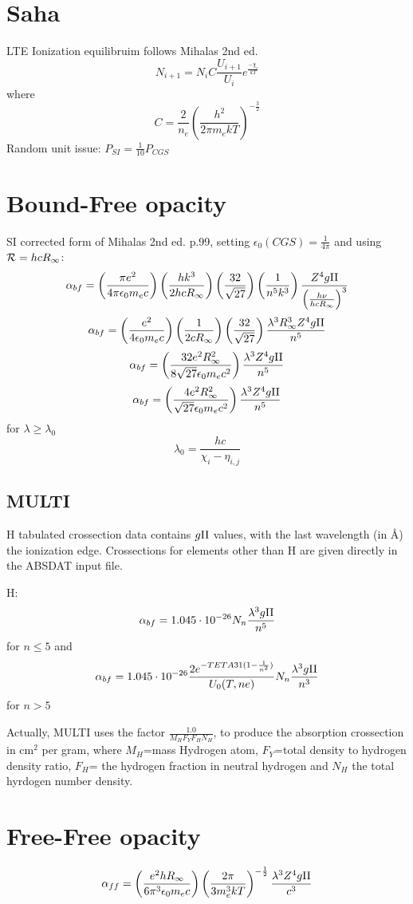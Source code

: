 \documentclass[a4paper]{article}
\begin{document}
\section{Saha}
LTE Ionization equilibruim follows Mihalas 2nd ed. 
$$
N_{i+1}=N_i C \frac{U_{i+1}}{U_i}e^\frac{-\chi_i}{k T}
$$
where
$$
C=\frac{2}{n_e}\left(\frac{h^2}{2\pi m_e k T}\right)^{-\frac{3}{2}}
$$
Random unit issue: $P_{SI}=\frac{1}{10} P_{CGS}$

\section{Bound-Free opacity}
SI corrected form of Mihalas 2nd ed. p.99, setting $\epsilon_0(CGS)=\frac{1}{4\pi}$ and using ${\cal R}=h c R_\infty$:
$$
  \alpha_{bf}=\left(\frac{\pi e^2}{4\pi\epsilon_0 m_e c}\right) \left(\frac{h k^3}{2 h c R_\infty}\right) \left(\frac{32}{\sqrt{27}}\right) \left(\frac{1}{n^5 k^3}\right)
  \frac{Z^4 g{\rm II}}{\left(\frac{h \nu}{h c R_\infty}\right)^3}
$$
$$
  \alpha_{bf}=\left(\frac{e^2}{4\epsilon_0 m_e c}\right) \left(\frac{1}{2 c R_\infty}\right) \left(\frac{32}{\sqrt{27}}\right)
  \frac{\lambda^3 R_\infty^3 Z^4 g{\rm II}}{n^5}
$$
$$
  \alpha_{bf}=\left(\frac{32 e^2R_\infty^2}{8\sqrt{27}\epsilon_0 m_e c^2}\right)
  \frac{\lambda^3 Z^4 g{\rm II}}{n^5}
$$
$$
  \alpha_{bf}=\left(\frac{4 e^2 R_\infty^2}{\sqrt{27} \epsilon_0 m_e c^2}\right)
  \frac{\lambda^3 Z^4 g{\rm II}}{n^5}
$$
for $\lambda\ge \lambda_0$
$$
 \lambda_0=\frac{h c}{\chi_i-\eta_{i,j}}
$$

\subsection{MULTI}
H tabulated crossection data contains $g{\rm II}$ values, with the last wavelength (in \AA) the ionization edge. Crossections for elements other than H are given directly in the ABSDAT input file. 

H:
$$
\alpha_{bf}=1.045\cdot 10^{-26} N_n \frac{\lambda^3 g{\rm II}}{n^5}
$$
for $n\le 5$ and
$$
\alpha_{bf}=1.045\cdot 10^{-26}\frac{2e^{-TETA31 (1-\frac{1}{n^2})}}{U_0(T,ne)} N_n \frac{\lambda^3 g{\rm II}}{n^3}
$$
for $n > 5$

Actually, MULTI uses the factor $\frac{1.0}{M_H F_Y F_H N_H}$, to produce the absorption crossection in cm$^2$ per gram, where $M_H$=mass Hydrogen atom, $F_Y$=total density to hydrogen density ratio, $F_H$= the hydrogen fraction in neutral hydrogen and $N_H$ the total hyrdogen number density.

\section{Free-Free opacity}
$$
  \alpha_{ff}=\left(\frac{e^2 h R_\infty}{6 \pi^3 \epsilon_0 m_e c}\right)\left(\frac{2 \pi}{3 m_e^3 k T}\right)^{-\frac{1}{2}}\frac{\lambda^3 Z^4 g{\rm II}}{c^3}
$$
\end{document}
